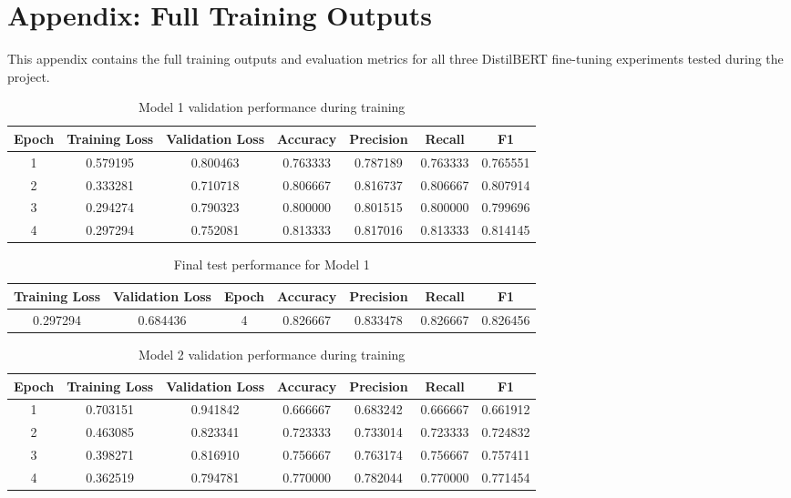 \documentclass[11pt]{article}
\begin{document}
\clearpage

\appendix

\section{Appendix: Full Training Outputs}

This appendix contains the full training outputs and evaluation metrics for all three DistilBERT fine-tuning experiments tested during the project.

\bigbreak

\begin{table}[h]
\centering
\begin{tabular}{ccccccc}
\toprule
Epoch & Training Loss & Validation Loss & Accuracy & Precision & Recall & F1 \\
\midrule
1 & 0.579195 & 0.800463 & 0.763333 & 0.787189 & 0.763333 & 0.765551 \\
2 & 0.333281 & 0.710718 & 0.806667 & 0.816737 & 0.806667 & 0.807914 \\
3 & 0.294274 & 0.790323 & 0.800000 & 0.801515 & 0.800000 & 0.799696 \\
4 & 0.297294 & 0.752081 & 0.813333 & 0.817016 & 0.813333 & 0.814145 \\
\bottomrule
\end{tabular}
\caption{Model 1 validation performance during training}
\end{table}


\begin{table}[h]
\centering
\begin{tabular}{ccccccc}
\toprule
Training Loss & Validation Loss & Epoch & Accuracy & Precision & Recall & F1 \\
\midrule
0.297294 & 0.684436 & 4 & 0.826667 & 0.833478 & 0.826667 & 0.826456 \\
\bottomrule
\end{tabular}
\caption{Final test performance for Model 1}
\end{table}


\begin{table}[h]
\centering
\begin{tabular}{ccccccc}
\toprule
Epoch & Training Loss & Validation Loss & Accuracy & Precision & Recall & F1 \\
\midrule
1 & 0.703151 & 0.941842 & 0.666667 & 0.683242 & 0.666667 & 0.661912 \\
2 & 0.463085 & 0.823341 & 0.723333 & 0.733014 & 0.723333 & 0.724832 \\
3 & 0.398271 & 0.816910 & 0.756667 & 0.763174 & 0.756667 & 0.757411 \\
4 & 0.362519 & 0.794781 & 0.770000 & 0.782044 & 0.770000 & 0.771454 \\
\bottomrule
\end{tabular}
\caption{Model 2 validation performance during training}
\end{table}
\end{document}
